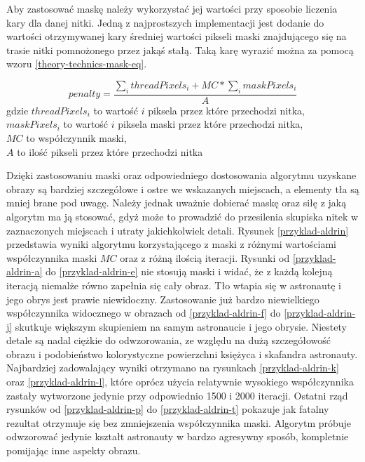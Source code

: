 \documentclass[a4paper, 12pt, polish, twoside]{extreport}
\begin{document}
        Aby zastosować maskę należy wykorzystać jej wartości przy sposobie liczenia kary dla danej nitki. Jedną z najprostszych implementacji jest dodanie do wartości otrzymywanej kary średniej wartości pikseli maski znajdującego się na trasie nitki pomnożonego przez jakąś stałą. Taką karę wyrazić można za pomocą wzoru \ref{theory-technics-mask-eq}.
    
        \begin{equation} \label{theory-technics-mask-eq}
            penalty = \frac{\sum_{i} threadPixels_{i} + {MC} * \sum_{i} maskPixels_{i}}{A}
        \end{equation}
        gdzie \(threadPixels_{i}\) to wartość \(i\) piksela przez które przechodzi nitka, \\
        \(maskPixels_{i}\) to wartość \(i\) piksela maski przez które przechodzi nitka, \\
        \(MC\) to współczynnik maski,\\
        \(A\) to ilość pikseli przez które przechodzi nitka
    
        \newpage
        Dzięki zastosowaniu maski oraz odpowiedniego dostosowania algorytmu uzyskane obrazy są bardziej szczegółowe i ostre we wskazanych miejscach, a elementy tła są mniej brane pod uwagę. Należy jednak uważnie dobierać maskę oraz siłę z jaką algorytm ma ją stosować, gdyż może to prowadzić do przesilenia skupiska nitek w zaznaczonych miejscach i utraty jakichkolwiek detali. Rysunek \ref{przyklad-aldrin} przedstawia wyniki algorytmu korzystającego z maski z różnymi wartościami współczynnika maski \(MC\) oraz z różną ilością iteracji. Rysunki od \ref{przyklad-aldrin-a} do \ref{przyklad-aldrin-e} nie stosują maski i widać, że z każdą kolejną iteracją niemalże równo zapełnia się cały obraz. Tło wtapia się w astronautę i jego obrys jest prawie niewidoczny. Zastosowanie już bardzo niewielkiego współczynnika widocznego w obrazach od \ref{przyklad-aldrin-f} do \ref{przyklad-aldrin-j} skutkuje większym skupieniem na samym astronaucie i jego obrysie. Niestety detale są nadal ciężkie do odwzorowania, ze względu na dużą szczegółowość obrazu i podobieństwo kolorystyczne powierzchni księżyca i skafandra astronauty. Najbardziej zadowalający wyniki otrzymano na rysunkach \ref{przyklad-aldrin-k} oraz \ref{przyklad-aldrin-l}, które oprócz użycia relatywnie wysokiego współczynnika zastały wytworzone jedynie przy odpowiednio 1500 i 2000 iteracji. Ostatni rząd rysunków od \ref{przyklad-aldrin-p} do \ref{przyklad-aldrin-t} pokazuje jak fatalny rezultat otrzymuje się bez zmniejszenia współczynnika maski. Algorytm próbuje odwzorować jedynie kształt astronauty w bardzo agresywny sposób, kompletnie pomijając inne aspekty obrazu.
        
\end{document}
